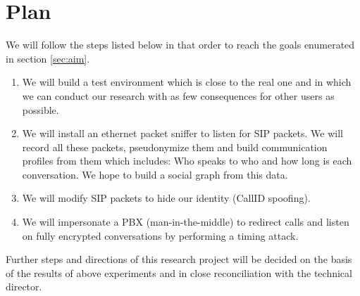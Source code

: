 \section{Plan}

We will follow the steps listed below in that order to reach the goals enumerated in section \ref{sec:aim}. 

\begin{enumerate}
\item We will build a test environment which is close to the real one and in which we can conduct our research with as few consequences for other users as possible.
\item We will install an ethernet packet sniffer to listen for SIP packets. We will record all these packets, pseudonymize them and build communication profiles from them which includes: Who speaks to who and how long is each conversation. We hope to build a social graph from this data.
\item We will modify SIP packets to hide our identity (CallID spoofing).
\item We will impersonate a PBX (man-in-the-middle) to redirect calls and listen on fully encrypted conversations by performing a timing attack.
\end{enumerate}

Further steps and directions of this research project will be decided on the basis of the results of above experiments and in close reconciliation with the technical director. 
